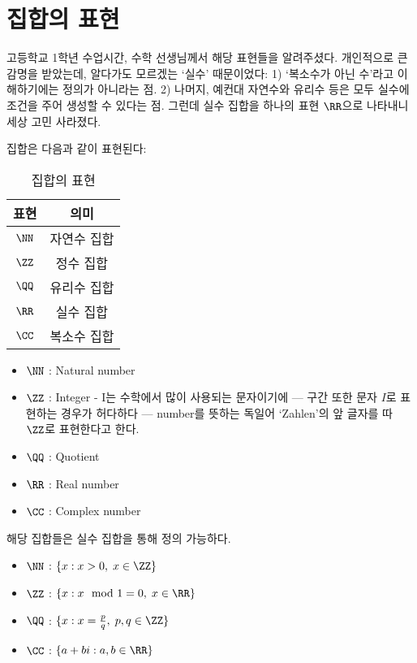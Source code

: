 \documentclass[../note.tex]{subfiles}
\begin{document}
\section{집합의 표현}
고등학교 1학년 수업시간, 수학 선생님께서 해당 표현들을 알려주셨다. 개인적으로 큰 감명을 받았는데, 알다가도 모르겠는 `실수' 때문이었다: 1) `복소수가 아닌 수'라고 이해하기에는 정의가 아니라는 점. 2) 나머지, 예컨대 자연수와 유리수 등은 모두 실수에 조건을 주어 생성할 수 있다는 점. 그런데 실수 집합을 하나의 표현 $\RR$으로 나타내니 세상 고민 사라졌다.

\begin{note}[집합의 표현]
  집합은 다음과 같이 표현된다:
  \begin{table}[H]
    \centering
    \begin{tabular}{ c c }
      표현 & 의미 \\
      \hline
      $\NN$ & 자연수 집합 \\
      $\ZZ$ & 정수 집합 \\
      $\QQ$ & 유리수 집합 \\
      $\RR$ & 실수 집합 \\
      $\CC$ & 복소수 집합 \\
    \end{tabular}
    \caption{집합의 표현}
  \end{table}
\end{note}

\begin{itemize}
  \item
    $\NN$ : Natural number
  \item
    $\ZZ$ : Integer - I는 수학에서 많이 사용되는 문자이기에 --- 구간 또한 문자 $I$로 표현하는 경우가 허다하다 --- number를 뜻하는 독일어 `Zahlen'의 앞 글자를 따 $\ZZ$로 표현한다고 한다.
  \item
    $\QQ$ : Quotient
  \item
    $\RR$ : Real number
  \item
    $\CC$ : Complex number
\end{itemize}

해당 집합들은 실수 집합을 통해 정의 가능하다.

\begin{definition}
  \begin{itemize}
    \item
      $\NN$ : $\{x : x > 0,\; x \in \ZZ\}$
    \item
      $\ZZ$ : $\{x : x \mod 1 = 0,\; x \in \RR\}$
    \item
      $\QQ$ : $\{x : x = \frac{p}{q},\; p, q \in \ZZ\}$
    \item
      $\CC$ : $\{a+bi : a, b \in \RR\}$
  \end{itemize}
\end{definition}
\end{document}
